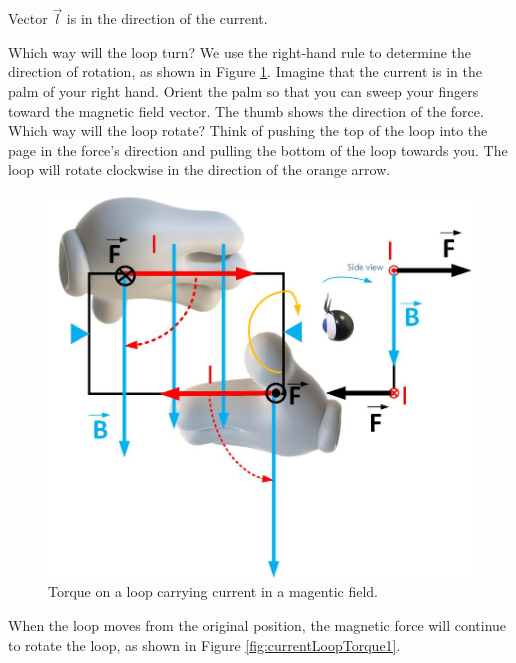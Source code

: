 \documentclass{ximera}
\begin{document}
Vector $\vec{l}$ is in the direction of the current. 

Which way will the loop turn? We use the right-hand rule to determine the direction of rotation, as shown in Figure \ref{fig:currentLoopTorque}. Imagine that the current is in the palm of your right hand. Orient the palm so that you can sweep your fingers toward the magnetic field vector. The thumb shows the direction of the force. Which way will the loop rotate? Think of pushing the top of the loop into the page in the force's direction and pulling the bottom of the loop towards you. The loop will rotate clockwise in the direction of the orange arrow.




\begin{figure}[htbp]
\begin{center}
\includegraphics[scale=0.6]{../jpg/loopRHR.jpg}
\end{center}
\caption{Torque on a loop carrying current in a magentic field. }
\label{fig:currentLoopTorque}
\end{figure}

When the loop moves from the original position, the magnetic force will continue to rotate the loop, as shown in Figure \ref{fig:currentLoopTorque1}.
\end{document}
